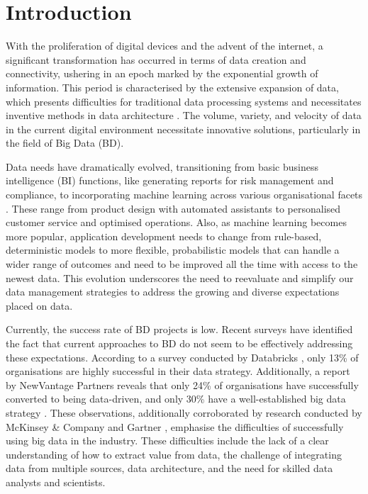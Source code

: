 \documentclass[preprint,12pt]{elsarticle}
\begin{document}
\linenumbers

\section{Introduction}

\label{sec:introduction} 

With the proliferation of digital devices and the advent of the internet, a significant transformation has occurred in terms of data creation and connectivity, ushering in an epoch marked by the exponential growth of information. This period is characterised by the extensive expansion of data, which presents difficulties for traditional data processing systems and necessitates inventive methods in data architecture \cite{AtaeiACIS, ataei2022state}. The volume, variety, and velocity of data in the current digital environment necessitate innovative solutions, particularly in the field of Big Data (BD).

Data needs have dramatically evolved, transitioning from basic business intelligence (BI) functions, like generating reports for risk management and compliance, to incorporating machine learning across various organisational facets \cite{ataei2023towards}. These range from product design with automated assistants to personalised customer service and optimised operations.  Also, as machine learning becomes more popular, application development needs to change from rule-based, deterministic models to more flexible, probabilistic models that can handle a wider range of outcomes and need to be improved all the time with access to the newest data. This evolution underscores the need to reevaluate and simplify our data management strategies to address the growing and diverse expectations placed on data.

Currently, the success rate of BD projects is low. Recent surveys have identified the fact that current approaches to BD do not seem to be effectively addressing these expectations. According to a survey conducted by Databricks \cite{DataBricksSurvey}, only 13\% of organisations are highly successful in their data strategy. Additionally, a report by NewVantage Partners reveals that only 24\% of organisations have successfully converted to being data-driven, and only 30\% have a well-established big data strategy \cite{newvantagepartners2023}. These observations, additionally corroborated by research conducted by McKinsey \& Company \cite{analytics2016age} and Gartner \cite{Nash}, emphasise the difficulties of successfully using big data in the industry. These difficulties include the lack of a clear understanding of how to extract value from data, the challenge of integrating data from multiple sources, data architecture, and the need for skilled data analysts and scientists. 
\end{document}

